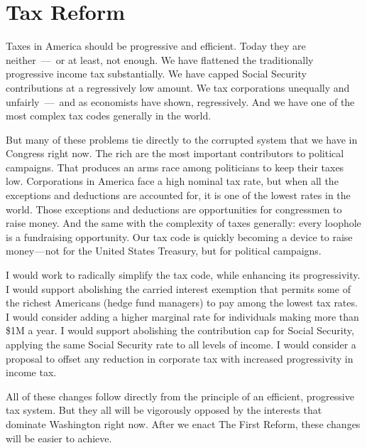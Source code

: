 \section{Tax Reform}
\label{sec:tax-reform}

Taxes in America should be progressive and efficient. 
Today they are neither~---~or at least, not enough. 
We have flattened the traditionally progressive income tax substantially. 
We have capped Social Security contributions at a regressively low amount. 
We tax corporations unequally and unfairly~---~and as economists have shown, regressively. 
And we have one of the most complex tax codes generally in the world.

But many of these problems tie directly to the corrupted system that we have in Con\-gress right now. 
The rich are the most important contributors to political campaigns. 
That produces an arms race among politicians to keep their taxes low. 
Corporations in America face a high nominal tax rate, but when all the exceptions and deductions are accounted for, it is one of the lowest rates in the world. 
Those exceptions and deductions are opportunities for congressmen to raise money. 
And the same with the complexity of taxes generally: every loophole is a fundraising opportunity. 
Our tax code is quickly becoming a device to raise money --- not for the United States Treasury, but for political campaigns.

I would work to radically simplify the tax code, while enhancing its progressivity. 
I would support abolishing the carried interest exemption that permits some of the richest Americans (hedge fund managers) to pay among the lowest tax rates. 
I would consider adding a higher marginal rate for individuals making more than \$1M a year. 
I would support abolishing the contribution cap for Social Security, applying the same Social Security rate to all levels of income. 
I would consider a proposal to offset any reduction in corporate tax with increased progressivity in income tax.

All of these changes follow directly from the principle of an efficient, progressive tax system. 
But they all will be vigorously opposed by the interests that dominate Washington right now. 
After we enact The First Reform, these changes will be easier to achieve.
